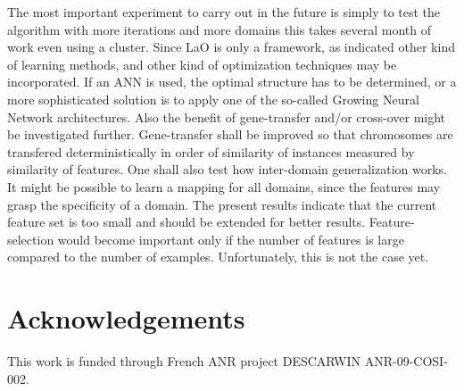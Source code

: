 \documentclass[letterpaper]{article}
\begin{document}
The most important experiment to carry out in the future is simply to test the algorithm with more iterations and more domains this takes several month of work even using a cluster. Since LaO is only a framework, as indicated other kind of learning methods, and other kind of optimization techniques may be incorporated. If an ANN is used, the optimal structure has to be determined, or a more sophisticated solution is to apply one of the so-called Growing Neural Network architectures. Also the benefit of gene-transfer and/or cross-over might be investigated further. Gene-transfer shall be improved so that chromosomes are transfered deterministically in order of similarity of instances measured by similarity of features. One shall also test how inter-domain generalization works. It might be possible to learn a mapping for all domains, since the features may grasp the specificity of a domain. The present results indicate that the current feature set is too small and should be extended for better results. Feature-selection would become important only if the number of features is large compared to the number of examples. Unfortunately, this is not the case yet.


\section{Acknowledgements}
This work is funded through French ANR project DESCARWIN ANR-09-COSI-002.




\end{document}
